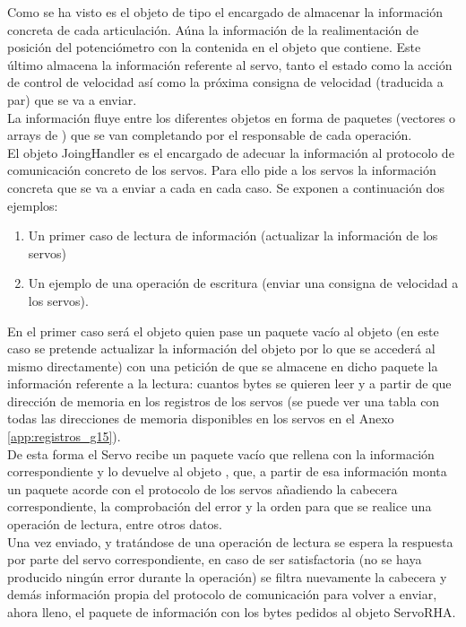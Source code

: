 	Como se ha visto es el objeto de tipo  el encargado de almacenar la información concreta de cada articulación. Aúna la información de la realimentación de posición del potenciómetro con la contenida en el objeto  que contiene. Este último almacena la información referente al servo, tanto el estado como la acción de control de velocidad así como la próxima consigna de velocidad (traducida a par) que se va a enviar.
	\\

	La información fluye entre los diferentes objetos en forma de paquetes (vectores o arrays de ) que se van completando por el responsable de cada operación.
	\\

	El objeto JoingHandler es el encargado de adecuar la información al protocolo de comunicación concreto de los servos. Para ello pide a los servos la información concreta que se va a enviar a cada en cada caso. Se exponen a continuación dos ejemplos:
	\begin{enumerate}
		\item Un primer caso de lectura de información (actualizar la información de los servos)
		\item Un ejemplo de una operación de escritura (enviar una consigna de velocidad a los servos).
	\end{enumerate}

	En el primer caso será el objeto  quien pase un paquete vacío al objeto  (en este caso se pretende actualizar la información del objeto  por lo que se accederá al mismo directamente) con una petición de que se almacene en dicho paquete la información referente a la lectura: cuantos bytes se quieren leer y a partir de que dirección de memoria en los registros de los servos (se puede ver una tabla con todas las direcciones de memoria disponibles en los servos en el Anexo \ref{app:registros_g15}).
	\\

	De esta forma el Servo recibe un paquete vacío que rellena con la información correspondiente y lo devuelve al objeto , que, a partir de esa información monta un paquete acorde con el protocolo de los servos añadiendo la cabecera correspondiente, la comprobación del error y la orden para que se realice una operación de lectura, entre otros datos.
	\\

	Una vez enviado, y tratándose de una operación de lectura se espera la respuesta por parte del servo correspondiente, en caso de ser satisfactoria (no se haya producido ningún error durante la operación) se filtra nuevamente la cabecera y demás información propia del protocolo de comunicación para volver a enviar, ahora lleno, el paquete de información con los bytes pedidos al objeto ServoRHA.

